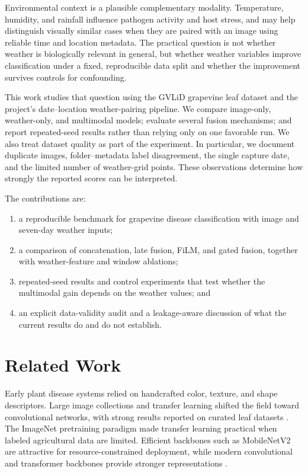 \documentclass[conference]{IEEEtran}
\begin{document}
Environmental context is a plausible complementary modality. Temperature, humidity, and rainfall influence pathogen activity and host stress, and may help distinguish visually similar cases when they are paired with an image using reliable time and location metadata. The practical question is not whether weather is biologically relevant in general, but whether weather variables improve classification under a fixed, reproducible data split and whether the improvement survives controls for confounding.

This work studies that question using the GVLiD grapevine leaf dataset and the project's date--location weather-pairing pipeline. We compare image-only, weather-only, and multimodal models; evaluate several fusion mechanisms; and report repeated-seed results rather than relying only on one favorable run. We also treat dataset quality as part of the experiment. In particular, we document duplicate images, folder--metadata label disagreement, the single capture date, and the limited number of weather-grid points. These observations determine how strongly the reported scores can be interpreted.

The contributions are:
\begin{enumerate}
    \item a reproducible benchmark for grapevine disease classification with image and seven-day weather inputs;
    \item a comparison of concatenation, late fusion, FiLM, and gated fusion, together with weather-feature and window ablations;
    \item repeated-seed results and control experiments that test whether the multimodal gain depends on the weather values; and
    \item an explicit data-validity audit and a leakage-aware discussion of what the current results do and do not establish.
\end{enumerate}

\section{Related Work}
Early plant disease systems relied on handcrafted color, texture, and shape descriptors. Large image collections and transfer learning shifted the field toward convolutional networks, with strong results reported on curated leaf datasets \cite{mohanty2016using,ferentinos2018deep,plantdoc}. The ImageNet pretraining paradigm \cite{imagenet} made transfer learning practical when labeled agricultural data are limited. Efficient backbones such as MobileNetV2 \cite{mobilenet} are attractive for resource-constrained deployment, while modern convolutional and transformer backbones provide stronger representations \cite{convnext,swin,vit}.
\end{document}

